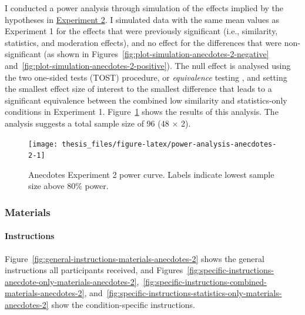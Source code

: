 \documentclass[a4paper, nobind, dvipsnames]{templates/ociamthesis}
\theoremstyle{definition}
\theoremstyle{definition}
\theoremstyle{definition}
\theoremstyle{definition}
\theoremstyle{remark}
\begin{document}
I conducted a power analysis through simulation of the effects implied by the
hypotheses in \protect\hyperlink{anecdotes-2}{Experiment 2}. I simulated data with the same mean
values as Experiment 1 for the effects that were previously significant (i.e.,
similarity, statistics, and moderation effects), and no effect for the
differences that were non-significant (as shown in
Figures~\ref{fig:plot-simulation-anecdotes-2-negative}
and~\ref{fig:plot-simulation-anecdotes-2-positive}). The null effect is
analysed using the two one-sided tests (TOST) procedure, or \emph{equivalence}
testing \autocite{lakens2018}, and setting the smallest effect size of interest to the
smallest difference that leads to a significant equivalence between the combined
low similarity and statistics-only conditions in Experiment 1.
Figure~\ref{fig:power-analysis-anecdotes-2} shows the results of this analysis.
The analysis suggests a total sample size of 96
(48 \(\times\) 2).

\newpage

\begin{landscape}



\begin{figure}
\texttt{[image: thesis\_files/figure-latex/power-analysis-anecdotes-2-1]} \caption{Anecdotes Experiment 2 power curve. Labels indicate lowest sample size above 80\% power.}\label{fig:power-analysis-anecdotes-2}
\end{figure}

\end{landscape}

\newpage

\hypertarget{materials-17}{%
\subsubsection{Materials}\label{materials-17}}

\hypertarget{instructions-materials-anecdotes-2-appendix}{%
\paragraph{Instructions}\label{instructions-materials-anecdotes-2-appendix}}

Figure~\ref{fig:general-instructions-materials-anecdotes-2} shows the general
instructions all participants received, and
Figures~\ref{fig:specific-instructions-anecdote-only-materials-anecdotes-2},~\ref{fig:specific-instructions-combined-materials-anecdotes-2},
and~\ref{fig:specific-instructions-statistics-only-materials-anecdotes-2} show
the condition-specific instructions.
\end{document}
